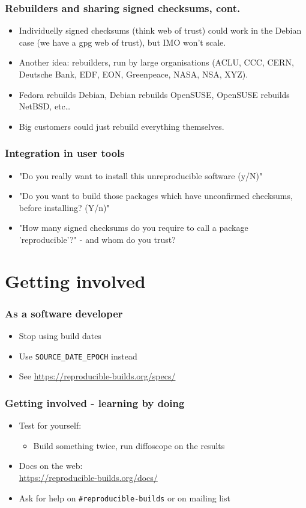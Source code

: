 \documentclass[14pt,aspectratio=169]{beamer}
\begin{document}
\begin{frame}
 \frametitle{Rebuilders and sharing signed checksums, cont.}
 \begin{itemize}
  \item Individuelly signed checksums (think web of trust) could work in the
  Debian case (we have a gpg web of trust), but IMO won't scale.
  \item { Another idea: rebuilders, run by large organisations
  (ACLU, CCC, CERN, Deutsche Bank, EDF, EON, Greenpeace, NASA, NSA, XYZ).}
  \item Fedora rebuilds Debian, Debian rebuilds OpenSUSE, OpenSUSE rebuilds
  NetBSD, etc…
  \item Big customers could just rebuild everything themselves.
 \end{itemize}
\end{frame}


\begin{frame}
 \frametitle{Integration in user tools}
 \begin{itemize}
  \item "Do you really want to install this unreproducible software (y/N)"
  \item<2-3> "Do you want to build those packages which have unconfirmed checksums,
  before installing? (Y/n)"
  \item<3>{ "How many signed checksums do you require to call a package
  'reproducible'?" - and whom do you trust?}
 \end{itemize}
\end{frame}


\section{Getting involved}

\begin{frame}
 \frametitle{As a software developer}
 \begin{itemize}
  \item Stop using build dates
  \item Use \texttt{SOURCE\_DATE\_EPOCH} instead
  \item See \url{https://reproducible-builds.org/specs/}
 \end{itemize}
\end{frame}

\begin{frame}
 \frametitle{Getting involved - learning by doing}

 \begin{itemize}
  \item Test for yourself:
   \begin{itemize}
    \item Build something twice, run diffoscope on the results
   \end{itemize}
  \item Docs on the web: \\
    \small{\url{https://reproducible-builds.org/docs/}} \\
  \item Ask for help on \texttt{\#reproducible-builds} or on mailing list
 \end{itemize}
\end{frame}
\end{document}
